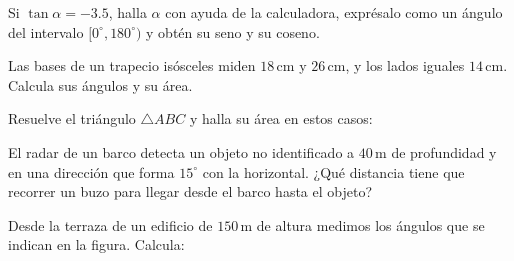 \documentclass[12pt]{exam}
\begin{document}
\begin{questions}

\question Si \( \tan \alpha = -3.5 \), halla \( \alpha \) con ayuda de la calculadora, exprésalo como un ángulo del intervalo \( [0^\circ, 180^\circ) \) y obtén su seno y su coseno.

\question Las bases de un trapecio isósceles miden \( 18 \, \text{cm} \) y \( 26 \, \text{cm} \), y los lados iguales \( 14 \, \text{cm} \). Calcula sus ángulos y su área.

\question Resuelve el triángulo \( \triangle ABC \) y halla su área en estos casos:  

\question El radar de un barco detecta un objeto no identificado a \( 40 \, \text{m} \) de profundidad y en una dirección que forma \( 15^\circ \) con la horizontal. ¿Qué distancia tiene que recorrer un buzo para llegar desde el barco hasta el objeto?

\question Desde la terraza de un edificio de \( 150 \, \text{m} \) de altura medimos los ángulos que se indican en la figura. Calcula: 

\begin{parts}

\end{parts}
\end{questions}
\end{document}
